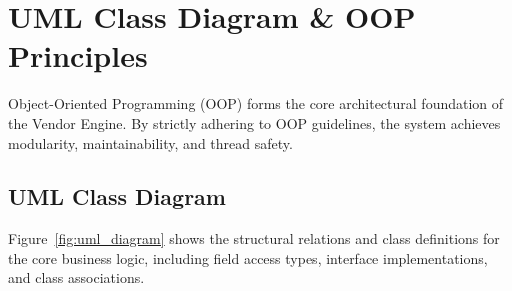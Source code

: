 
\section{UML Class Diagram \& OOP Principles}
\label{sec:uml_and_oop_design}

Object-Oriented Programming (OOP) forms the core architectural foundation of the Vendor Engine. By strictly adhering to OOP guidelines, the system achieves modularity, maintainability, and thread safety.

\subsection{UML Class Diagram}
Figure~\ref{fig:uml_diagram} shows the structural relations and class definitions for the core business logic, including field access types, interface implementations, and class associations.

